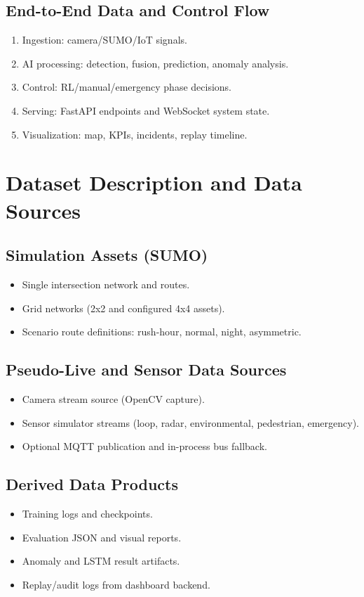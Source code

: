 \documentclass[conference]{IEEEtran}
\begin{document}
\subsection{End-to-End Data and Control Flow}
\begin{enumerate}[leftmargin=*]
	\item Ingestion: camera/SUMO/IoT signals.
	\item AI processing: detection, fusion, prediction, anomaly analysis.
	\item Control: RL/manual/emergency phase decisions.
	\item Serving: FastAPI endpoints and WebSocket system state.
	\item Visualization: map, KPIs, incidents, replay timeline.
\end{enumerate}

\section{Dataset Description and Data Sources}
\subsection{Simulation Assets (SUMO)}
\begin{itemize}[leftmargin=*]
	\item Single intersection network and routes.
	\item Grid networks (2x2 and configured 4x4 assets).
	\item Scenario route definitions: rush-hour, normal, night, asymmetric.
\end{itemize}

\subsection{Pseudo-Live and Sensor Data Sources}
\begin{itemize}[leftmargin=*]
	\item Camera stream source (OpenCV capture).
	\item Sensor simulator streams (loop, radar, environmental, pedestrian, emergency).
	\item Optional MQTT publication and in-process bus fallback.
\end{itemize}

\subsection{Derived Data Products}
\begin{itemize}[leftmargin=*]
	\item Training logs and checkpoints.
	\item Evaluation JSON and visual reports.
	\item Anomaly and LSTM result artifacts.
	\item Replay/audit logs from dashboard backend.
\end{itemize}
\end{document}
